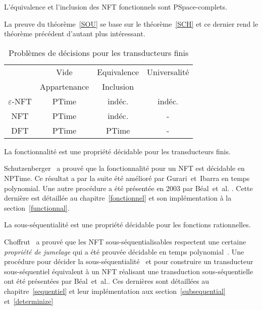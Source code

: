     \begin{theorem}
        L'équivalence et l'inclusion des NFT fonctionnels sont PSpace-complets.
        \label{SOU}
    \end{theorem}
    
    La preuve du théorème~\ref{SOU} se base sur le théorème~\ref{SCH} et ce dernier rend le théorème précédent d'autant plus intéressant. \\
    
    \begin{table}
    	\center
        \begin{tabular}{c|c|c|c}
            & Vide & Equivalence & Universalité \\
            & Appartenance & Inclusion & \\
            \hline
            $\varepsilon$-NFT & PTime & indéc. & indéc. \\
            NFT & PTime & indéc. & - \\
            DFT & PTime & PTime & - \\
        \end{tabular}
        \caption{Problèmes de décisions pour les transducteurs finis}
        \label{DEC}
    \end{table}

    \begin{theorem}
        La fonctionnalité est une propriété décidable pour les transducteurs finis.
        \label{SCH}
    \end{theorem}
    
    Schutzenberger~\cite{Sch75} a prouvé que la fonctionnalité pour un NFT est décidable en NPTime. Ce résultat a par la suite été amélioré par Gurari~et~Ibarra \cite{Gi83} en temps polynomial. Une autre procédure a été présentée en 2003 par Béal~et~al. \cite{Bea03}. Cette dernière est détaillée au chapitre~\ref{fonctionnel} et son implémentation à la section~\ref{functionnal}. \\
    
    \begin{theorem}
        La sous-séquentialité est une propriété décidable pour les fonctions rationnelles.
    \end{theorem}
    
    Choffrut~\cite{Cho77} a prouvé que les NFT sous-séquentialisables respectent une certaine \emph{propriété de jumelage} qui a été prouvée décidable en temps polynomial~\cite{Wk95}. Une procédure pour décider la sous-séquentialité~\cite{Bea03} et pour construire un transducteur sous-séquentiel équivalent à un NFT réalisant une transduction sous-séquentielle~\cite{Bea02} ont été présentées par Béal~et~al.. Ces dernières sont détaillées au chapitre~\ref{sequentiel} et leur implémentation aux section~\ref{subsequential} et~\ref{determinize}